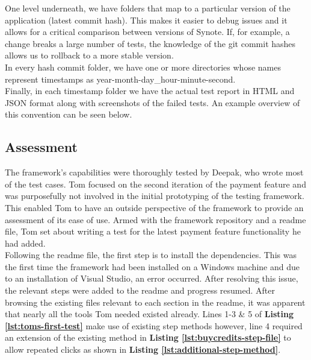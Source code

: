 One level underneath, we have folders that map to a particular version of the application (latest commit hash). This makes it easier to debug issues and it allows for a critical comparison between versions of Synote. If, for example, a change breaks a large number of tests, the knowledge of the git commit hashes allows us to rollback to a more stable version.
\\

In every hash commit folder, we have one or more directories whose names represent timestamps as year-month-day\_hour-minute-second.
\\

Finally, in each timestamp folder we have the actual test report in HTML and JSON format along with screenshots of the failed tests. An example overview of this convention can be seen below.
\\

\label{fig:reports-file-structure}

\subsection{Assessment}
\label{subsec:assessment}

The framework's capabilities were thoroughly tested by Deepak, who wrote most of the test cases. Tom focused on the second iteration of the payment feature and was purposefully not involved in the initial prototyping of the testing framework. This enabled Tom to have an outside perspective of the framework to provide an assessment of its ease of use. Armed with the framework repository and a readme file, Tom set about writing a test for the latest payment feature functionality he had added.\\

Following the readme file, the first step is to install the dependencies. This was the first time the framework had been installed on a Windows machine and due to an installation of Visual Studio, an error occurred. After resolving this issue, the relevant steps were added to the readme and progress resumed. After browsing the existing files relevant to each section in the readme, it was apparent that nearly all the tools Tom needed existed already. Lines 1-3 \& 5 of \textbf{Listing \ref{lst:toms-first-test}} make use of existing step methods however, line 4 required an extension of the existing method in \textbf{Listing \ref{lst:buycredits-step-file}} to allow repeated clicks as shown in \textbf{Listing \ref{lst:additional-step-method}}.\\

